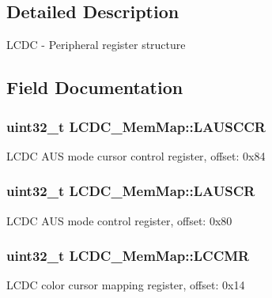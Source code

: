 \subsection{Detailed Description}
L\+C\+D\+C -\/ Peripheral register structure 

\subsection{Field Documentation}
\hypertarget{struct_l_c_d_c___mem_map_affa1e28918315f44e2105aead9e695bc}{}
\subsubsection[{L\+A\+U\+S\+C\+C\+R}]{\setlength{\rightskip}{0pt plus 5cm}uint32\+\_\+t L\+C\+D\+C\+\_\+\+Mem\+Map\+::\+L\+A\+U\+S\+C\+C\+R}\label{struct_l_c_d_c___mem_map_affa1e28918315f44e2105aead9e695bc}
L\+C\+D\+C A\+U\+S mode cursor control register, offset\+: 0x84 \hypertarget{struct_l_c_d_c___mem_map_a4554fe80ffc64089e17a03de67cb47a1}{}
\subsubsection[{L\+A\+U\+S\+C\+R}]{\setlength{\rightskip}{0pt plus 5cm}uint32\+\_\+t L\+C\+D\+C\+\_\+\+Mem\+Map\+::\+L\+A\+U\+S\+C\+R}\label{struct_l_c_d_c___mem_map_a4554fe80ffc64089e17a03de67cb47a1}
L\+C\+D\+C A\+U\+S mode control register, offset\+: 0x80 \hypertarget{struct_l_c_d_c___mem_map_a35f3831166bce45afb02d6cfa594fd84}{}
\subsubsection[{L\+C\+C\+M\+R}]{\setlength{\rightskip}{0pt plus 5cm}uint32\+\_\+t L\+C\+D\+C\+\_\+\+Mem\+Map\+::\+L\+C\+C\+M\+R}\label{struct_l_c_d_c___mem_map_a35f3831166bce45afb02d6cfa594fd84}
L\+C\+D\+C color cursor mapping register, offset\+: 0x14 \hypertarget{struct_l_c_d_c___mem_map_a54db054fbd1e4a7de44253909bbc8944}{}
